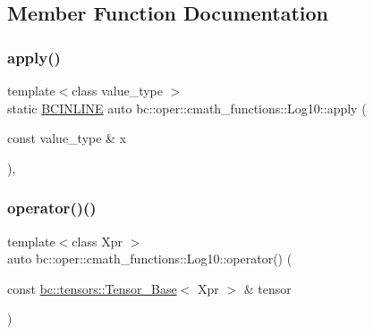 \subsection{Member Function Documentation}
\mbox{\label{structbc_1_1oper_1_1cmath__functions_1_1Log10_ac4260f0f515a806d67f7584956614bdf}} 
\subsubsection{\texorpdfstring{apply()}{apply()}}
{\footnotesize\ttfamily template$<$class value\+\_\+type $>$ \\
static \hyperlink{common_8h_a6699e8b0449da5c0fafb878e59c1d4b1}{B\+C\+I\+N\+L\+I\+NE} auto bc\+::oper\+::cmath\+\_\+functions\+::\+Log10\+::apply (\begin{DoxyParamCaption}\item[{const value\+\_\+type \&}]{x }\end{DoxyParamCaption})\hspace{0.3cm}{\ttfamily [inline]}, {\ttfamily [static]}}

\mbox{\label{structbc_1_1oper_1_1cmath__functions_1_1Log10_ae88de77a67b4808b671d96cf1908c0d6}} 
\subsubsection{\texorpdfstring{operator()()}{operator()()}\hspace{0.1cm}{\footnotesize\ttfamily [1/3]}}
{\footnotesize\ttfamily template$<$class Xpr $>$ \\
auto bc\+::oper\+::cmath\+\_\+functions\+::\+Log10\+::operator() (\begin{DoxyParamCaption}\item[{const \hyperlink{classbc_1_1tensors_1_1Tensor__Base}{bc\+::tensors\+::\+Tensor\+\_\+\+Base}$<$ Xpr $>$ \&}]{tensor }\end{DoxyParamCaption})\hspace{0.3cm}{\ttfamily [inline]}}

